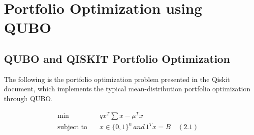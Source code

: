\documentclass[a4paper]{article}
\theoremstyle{plain}
\theoremstyle{definition}
\begin{document}
\clearpage

\section{Portfolio Optimization using QUBO}
\subsection{QUBO and QISKIT Portfolio Optimization} 


The following is the portfolio optimization problem presented in the Qiskit document, which implements the typical mean-distribution portfolio optimization through QUBO. 

\begin{align*}
\min \ \ \, \quad &qx^{T}\displaystyle\sum x - \mu^{T}x \\ 
\text{subject to}\quad &x\in\{0,1\}^n\,and\,1^Tx=B \quad(2.1)
\end{align*}
 
\end{document}
